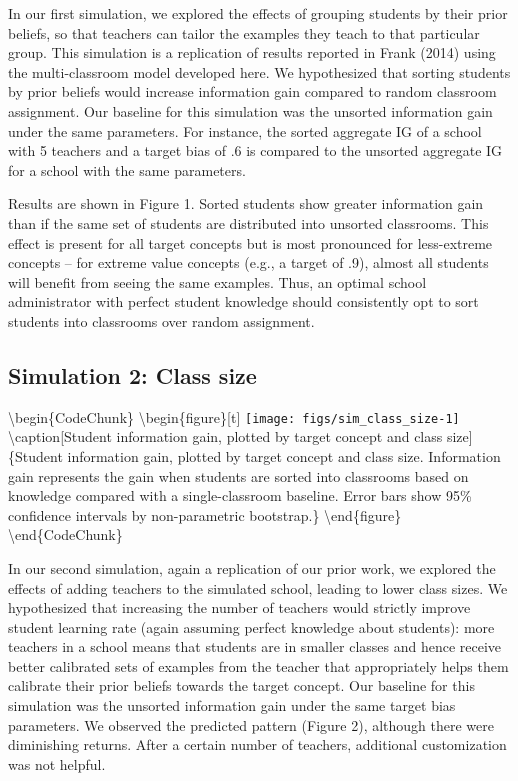 \documentclass[10pt, letterpaper]{article}
\begin{document}
In our first simulation, we explored the effects of grouping students by
their prior beliefs, so that teachers can tailor the examples they teach
to that particular group. This simulation is a replication of results
reported in Frank (2014) using the multi-classroom model developed here.
We hypothesized that sorting students by prior beliefs would increase
information gain compared to random classroom assignment. Our baseline
for this simulation was the unsorted information gain under the same
parameters. For instance, the sorted aggregate IG of a school with 5
teachers and a target bias of .6 is compared to the unsorted aggregate
IG for a school with the same parameters.

Results are shown in Figure 1. Sorted students show greater information
gain than if the same set of students are distributed into unsorted
classrooms. This effect is present for all target concepts but is most
pronounced for less-extreme concepts -- for extreme value concepts
(e.g., a target of .9), almost all students will benefit from seeing the
same examples. Thus, an optimal school administrator with perfect
student knowledge should consistently opt to sort students into
classrooms over random assignment.

\subsection{Simulation 2: Class size}\label{simulation-2-class-size}

\textbackslash{}begin\{CodeChunk\}
\textbackslash{}begin\{figure\}{[}t{]}
\texttt{[image: figs/sim\_class\_size-1]}
\textbackslash{}caption{[}Student information gain, plotted by target
concept and class size{]}\{Student information gain, plotted by target
concept and class size. Information gain represents the gain when
students are sorted into classrooms based on knowledge compared with a
single-classroom baseline. Error bars show 95\% confidence intervals by
non-parametric bootstrap.\}\label{fig:sim_class_size}
\textbackslash{}end\{figure\} \textbackslash{}end\{CodeChunk\}

In our second simulation, again a replication of our prior work, we
explored the effects of adding teachers to the simulated school, leading
to lower class sizes. We hypothesized that increasing the number of
teachers would strictly improve student learning rate (again assuming
perfect knowledge about students): more teachers in a school means that
students are in smaller classes and hence receive better calibrated sets
of examples from the teacher that appropriately helps them calibrate
their prior beliefs towards the target concept. Our baseline for this
simulation was the unsorted information gain under the same target bias
parameters. We observed the predicted pattern (Figure 2), although there
were diminishing returns. After a certain number of teachers, additional
customization was not helpful.
\end{document}
